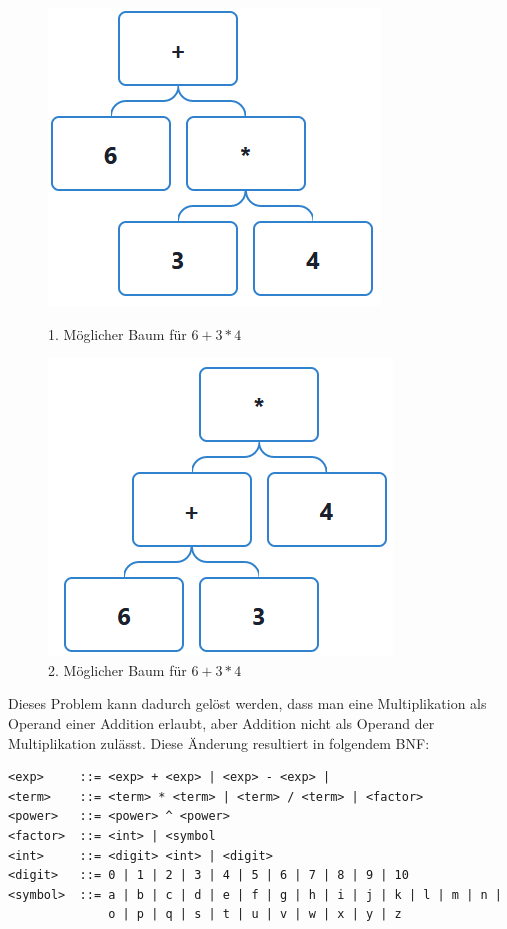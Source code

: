 \documentclass[11pt]{article}
\begin{document}
\begin{figure}[h]
\begin{minipage}{.5\textwidth}
  \centering
  \includegraphics[scale=0.5]{trees/beispiel_bnf_2_1.png}
  \caption{1. Möglicher Baum für $6+3*4$}
\end{minipage}
\begin{minipage}{.5\textwidth}
  \centering
  \includegraphics[scale=0.5]{trees/beispiel_bnf_2_2.png}
  \caption{2. Möglicher Baum für $6+3*4$}
\end{minipage}
\end{figure}

Dieses Problem kann dadurch gelöst werden, dass man eine Multiplikation als 
Operand einer Addition erlaubt, aber Addition nicht als Operand der Multiplikation 
zulässt. Diese Änderung resultiert in folgendem BNF:

\begin{verbatim}
<exp>     ::= <exp> + <exp> | <exp> - <exp> | 
<term>    ::= <term> * <term> | <term> / <term> | <factor>
<power>   ::= <power> ^ <power>
<factor>  ::= <int> | <symbol 
<int>     ::= <digit> <int> | <digit>
<digit>   ::= 0 | 1 | 2 | 3 | 4 | 5 | 6 | 7 | 8 | 9 | 10
<symbol>  ::= a | b | c | d | e | f | g | h | i | j | k | l | m | n | 
              o | p | q | s | t | u | v | w | x | y | z
\end{verbatim}
\end{document}
